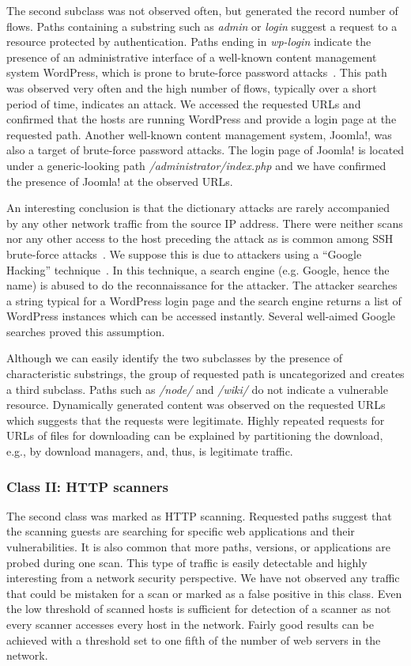 The second subclass was not observed often, but generated the record number of flows. Paths containing a substring such as \textit{admin} or \textit{login} suggest a request to a resource protected by authentication. Paths ending in \textit{wp-login} indicate the presence of an administrative interface of a well-known content management system WordPress, which is prone to brute-force password attacks~\cite{WordPressCodex-2014-Brute}. This path was observed very often and the high number of flows, typically over a short period of time, indicates an attack. We accessed the requested URLs and confirmed that the hosts are running WordPress and provide a login page at the requested path. Another well-known content management system, Joomla!, was also a target of brute-force password attacks. The login page of Joomla! is located under a generic-looking path \textit{/administrator/index.php} and we have confirmed the presence of Joomla! at the observed URLs.

An interesting conclusion is that the dictionary attacks are rarely accompanied by any other network traffic from the source IP address. There were neither scans nor any other access to the host preceding the attack as is common among SSH brute-force attacks~\cite{Vykopal-2013-Flow}. We suppose this is due to attackers using a ``Google Hacking'' technique~\cite{Billig-2008-Evaluation}. In this technique, a search engine (e.g. Google, hence the name) is abused to do the reconnaissance for the attacker. The attacker searches a string typical for a WordPress login page and the search engine returns a list of WordPress instances which can be accessed instantly. Several well-aimed Google searches proved this assumption.

Although we can easily identify the two subclasses by the presence of characteristic substrings, the group of requested path is uncategorized and creates a third subclass. Paths such as \textit{/node/} and \textit{/wiki/} do not indicate a vulnerable resource. Dynamically generated content was observed on the requested URLs which suggests that the requests were legitimate. Highly repeated requests for URLs of files for downloading can be explained by partitioning the download, e.g., by download managers, and, thus, is legitimate traffic.

\subsubsection{Class II: HTTP scanners}

The second class was marked as HTTP scanning. Requested paths suggest that the scanning guests are searching for specific web applications and their vulnerabilities. It is also common that more paths, versions, or applications are probed during one scan. This type of traffic is easily detectable and highly interesting from a network security perspective. We have not observed any traffic that could be mistaken for a scan or marked as a false positive in this class. Even the low threshold of scanned hosts is sufficient for detection of a scanner as not every scanner accesses every host in the network. Fairly good results can be achieved with a threshold set to one fifth of the number of web servers in the network.

